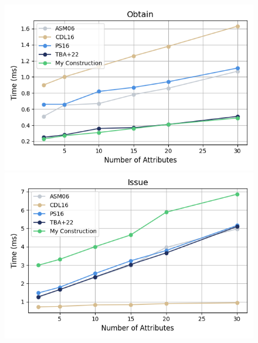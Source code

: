 \begin{figure}
    \begin{minipage}{0.48\textwidth}
        \centering
        \includegraphics[width=\textwidth]{figures/chap2_anoncreds_obtain.png}
    \end{minipage}
    \hfill
    \begin{minipage}{0.48\textwidth}
        \centering
        \includegraphics[width=\textwidth]{figures/chap2_anoncreds_issue.png}
    \end{minipage}
    
    \vspace{0.1cm}
    

\end{figure}
